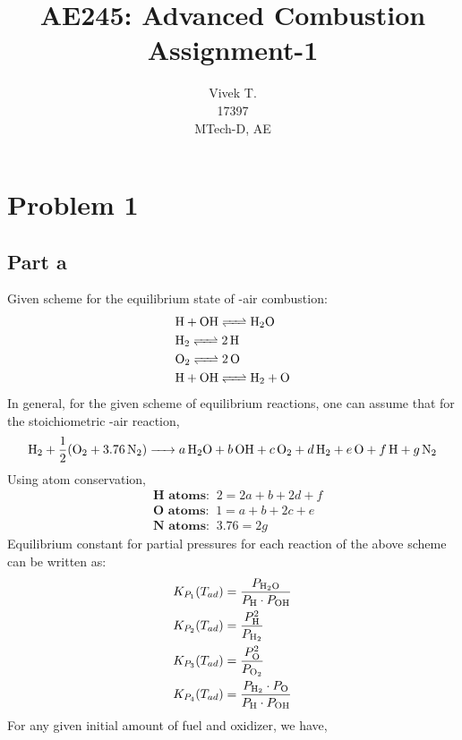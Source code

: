 \documentclass[a4paper,fleqn]{article}
\title{\textbf{AE245: Advanced Combustion} \\Assignment-1}
\author{Vivek T.\\
	17397\\MTech-D, AE\\
	\ttfamily{tvivek@iisc.ac.in}}
\begin{document}
	\maketitle
	
	\section*{Problem 1}
	\subsection*{Part a}
	Given scheme for the equilibrium state of -air combustion:
	\begin{equation*}
	\begin{split}
	&\ce{H + OH <=> H2O}\\
	&\ce{H2 <=> 2H}\\
	&\ce{O2 <=> 2O}\\
	&\ce {H + OH <=> H2 + O}
	\end{split}
	\end{equation*}
	In general, for the given scheme of equilibrium reactions, one can assume that for the stoichiometric -air reaction, 
	\begin{equation*}
	\ce{H2 + \frac{1}{2}(O2 + 3.76 N2) -> a H2O + b OH + c O2 + d H2 + e O + f H + g N2}
	\end{equation*}
	Using atom conservation,
	\begin{equation*}
	\begin{split}
	&\textbf{H atoms: }~2 = 2a + b + 2d + f\\
	&\textbf{O atoms: }~1 = a + b + 2c + e\\
	&\textbf{N atoms: }~3.76 = 2g
	\end{split}
	\end{equation*}
	Equilibrium constant for partial pressures for each reaction of the above scheme can be written as:
	\begin{equation*}
	\begin{split}
	&K_{P_{1}}(T_{ad}) = \frac{P_{\ce{H2O}}}{P_{\ce{H}} \cdot P_{\ce{OH}}}\\
	&K_{P_{2}}(T_{ad}) = \frac{P^2_{\ce{H}}}{P_{\ce{H2}}}\\
	&K_{P_{3}}(T_{ad}) = \frac{P^2_{\ce{O}}}{P_{\ce{O2}}}\\
	&K_{P_{4}}(T_{ad}) = \frac{P_{\ce{H2}} \cdot P_{\ce{O}}}{P_{\ce{H}} \cdot P_{\ce{OH}}}
	\end{split}
	\end{equation*}
	For any given initial amount of fuel and oxidizer, we have,
\end{document}
